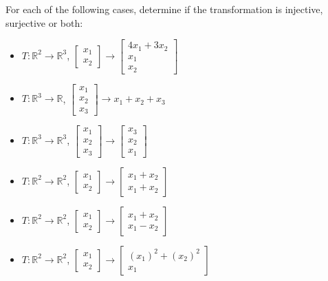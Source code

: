 \begin{exercise}
    For each of the following cases, determine if the transformation is injective, surjective or both:
    \begin{itemize}[itemsep=1pt,label=$\circ$]
        \item $T: \mathbb{R}^2 \to \mathbb{R}^3$, $\begin{bmatrix}x_1 \\ x_2\end{bmatrix} \to \begin{bmatrix}4x_1 + 3x_2 \\ x_1 \\ x_2\end{bmatrix}$
        \item $T: \mathbb{R}^3 \to \mathbb{R}$, $\begin{bmatrix}x_1 \\ x_2 \\ x_3\end{bmatrix} \to x_1 + x_2 + x_3$
        \item $T: \mathbb{R}^3 \to \mathbb{R}^3$, $\begin{bmatrix}x_1 \\ x_2 \\ x_3\end{bmatrix} \to \begin{bmatrix}x_3 \\ x_2 \\ x_1\end{bmatrix}$
        \item $T: \mathbb{R}^2 \to \mathbb{R}^2$, $\begin{bmatrix}x_1 \\ x_2\end{bmatrix} \to \begin{bmatrix}x_1 + x_2 \\ x_1 + x_2\end{bmatrix}$
        \item $T: \mathbb{R}^2 \to \mathbb{R}^2$, $\begin{bmatrix}x_1 \\ x_2\end{bmatrix} \to \begin{bmatrix}x_1 + x_2 \\ x_1 - x_2\end{bmatrix}$
        \item $T: \mathbb{R}^2 \to \mathbb{R}^2$, $\begin{bmatrix}x_1 \\ x_2\end{bmatrix} \to \begin{bmatrix}(x_1)^2 + (x_2)^2 \\ x_1\end{bmatrix}$

\end{itemize}
\end{exercise}
